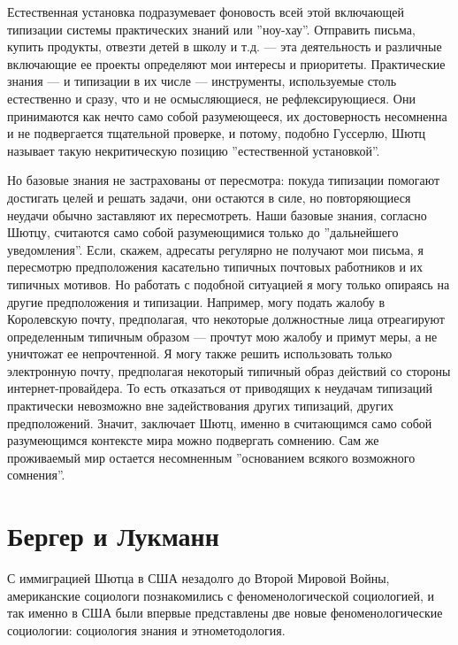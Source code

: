 \documentclass[11pt]{book}
\begin{document}
Естественная установка подразумевает фоновость всей этой включающей типизации системы практических знаний или ''ноу-хау''. Отправить письма, купить продукты, отвезти детей в школу и т.д. --- эта деятельность и различные включающие ее проекты определяют мои интересы и приоритеты. Практические знания --- и типизации в их числе --- инструменты, используемые столь естественно и сразу, что и не осмысляющиеся, не рефлексирующиеся. Они принимаются как нечто само собой разумеющееся, их достоверность несомненна и не подвергается тщательной проверке, и потому, подобно Гуссерлю, Шютц называет такую некритическую позицию ''естественной установкой''.

Но базовые знания не застрахованы от пересмотра: покуда типизации помогают достигать целей и решать задачи, они остаются в силе, но повторяющиеся неудачи обычно заставляют их пересмотреть. Наши базовые знания, согласно Шютцу, считаются само собой разумеющимися только до ''дальнейшего уведомления''. Если, скажем, адресаты регулярно не получают мои письма, я пересмотрю предположения касательно типичных почтовых работников и их типичных мотивов. Но работать с подобной ситуацией я могу только опираясь на другие предположения и типизации. Например, могу подать жалобу в Королевскую почту, предполагая, что некоторые должностные лица отреагируют определенным типичным образом --- прочтут мою жалобу и примут меры, а не уничтожат ее непрочтенной. Я могу также решить использовать только электронную почту, предполагая некоторый типичный образ действий со стороны интернет-провайдера. То есть отказаться от приводящих к неудачам типизаций практически невозможно вне задействования других типизаций, других предположений. Значит, заключает Шютц, именно в считающимся само собой разумеющимся контексте мира можно подвергать сомнению. Сам же проживаемый мир остается несомненным ''основанием всякого возможного сомнения''.

\section{Бергер и Лукманн}

С иммиграцией Шютца в США незадолго до Второй Мировой Войны, американские социологи познакомились с феноменологической социологией, и так именно в США были впервые представлены две новые феноменологические социологии: социология знания и этнометодология.
\end{document}
